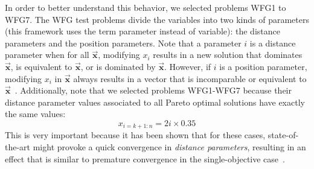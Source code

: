 
In order to better understand this behavior, we selected problems WFG1 to WFG7.
%
The WFG test problems divide the variables into two kinds of parameters (this framework uses the term parameter instead of 
variable): the distance parameters and the position parameters.
%
Note that a parameter $i$ is a distance parameter when for all $\vec{\mathbf{x}}$, modifying $x_i$ results in a new solution 
that dominates $\vec{\mathbf{x}}$, is equivalent to $\vec{\mathbf{x}}$, or is dominated by $\vec{\mathbf{x}}$.
%
However, if $i$ is a position parameter, modifying $x_i$ in $\vec{\mathbf{x}}$ always results in a vector that is incomparable or 
equivalent to $\vec{\mathbf{x}}$~\citep{huband2005scalable}.
%
Additionally, note that we selected problems WFG1-WFG7 because their distance parameter values associated to all Pareto optimal solutions 
have exactly the same values:
%
\begin{equation}
   x_{i=k+1:n} = 2i \times 0.35
\end{equation}
%
This is very important because it has been shown that for these cases, state-of-the-art
\MOEAS{} might provoke a quick convergence in \textit{distance parameters}, resulting in an effect that is similar to 
premature convergence in the single-objective case~\citep{Joel:GDE3_CEC09,castillo2017multi}.


